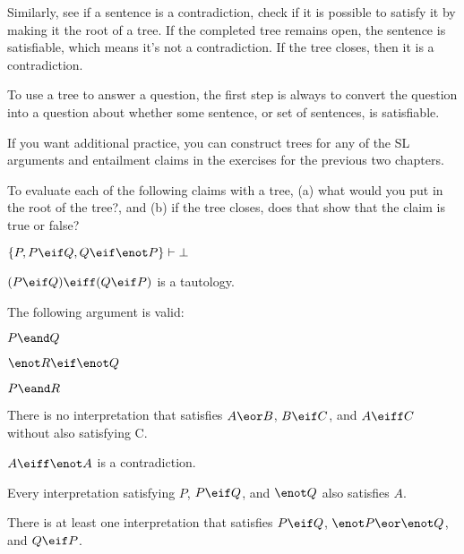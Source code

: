 Similarly, see if a sentence is a contradiction, check if it is possible to satisfy it by making it the root of a tree.
If the completed tree remains open, the sentence is satisfiable, which means it's not a contradiction.
If the tree closes, then it is a contradiction.

To use a tree to answer a question, the first step is always to convert the question into a question about whether some sentence, or set of sentences, is satisfiable. 

\vspace{-2em}


\iffalse

\practiceproblems

\vspace{-2em}

If you want additional practice, you can construct trees for any of the SL arguments and entailment claims in the exercises for the previous two chapters.

\solutions
\problempart 
\label{pr.sl.treeroot}
To evaluate each of the following claims with a tree, (a) what would you put in the root of the tree?, and (b) if the tree closes, does that show that the claim is true or false?
\begin{earg}
\item $\{P, P \eif Q, Q \eif \enot P\} \vdash{}\bot$
\item $(P \eif Q) \eiff (Q \eif P)$ is a tautology.
\item The following argument is valid:
	\begin{ekey}
		\item[] $P \eand Q$
		\item[] $\enot R \eif \enot Q$
		\item[\therefore] $P \eand R$
	\end{ekey}
\item There is no interpretation that satisfies $A \eor B$, $B \eif C$, and $A \eiff C$ without also satisfying C.
\item $A \eiff \enot A$ is a contradiction.
\item Every interpretation satisfying $P$, $P \eif Q$, and $\enot Q$ also satisfies $A$.
\item There is at least one interpretation that satisfies $P \eif Q$, $\enot P \eor \enot Q$, and $Q \eif P$.
 \end{earg}

